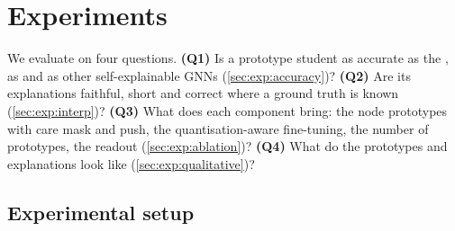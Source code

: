 %
%
%

\section{Experiments}
\label{sec:experiments}

We evaluate \ours{} on four questions.
\textbf{(Q1)} Is a prototype student as accurate as the \teacher{}, as \classic{} and
as other self-explainable GNNs (\cref{sec:exp:accuracy})?
\textbf{(Q2)} Are its explanations faithful, short and correct where a ground truth is
known (\cref{sec:exp:interp})?
\textbf{(Q3)} What does each component bring: the node prototypes with care mask and push,
the quantisation-aware fine-tuning, the number of prototypes, the readout
(\cref{sec:exp:ablation})?
\textbf{(Q4)} What do the prototypes and explanations look like (\cref{sec:exp:qualitative})?

\subsection{Experimental setup}
\label{sec:exp:setup}


